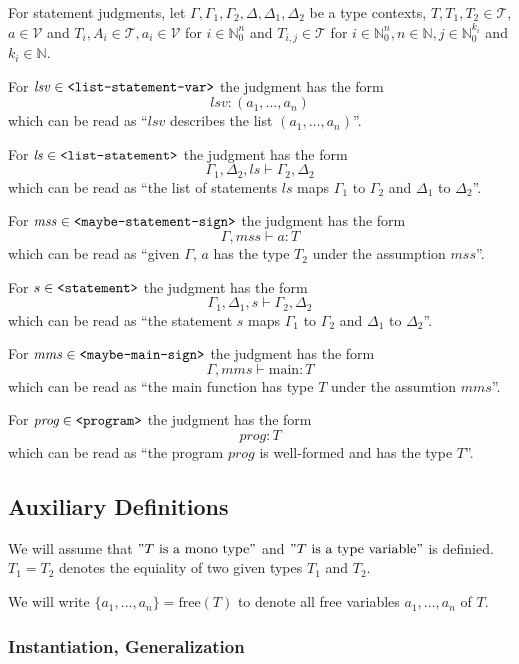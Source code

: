 \documentclass[]{scrbook}
\newcommand{\mf}[1]{\text{\texttt{#1}}}
\theoremstyle{definition}
\theoremstyle{definition}
\theoremstyle{definition}
\theoremstyle{remark}
\begin{document}
For statement judgments, let
\(\Gamma,\Gamma_1,\Gamma_2,\Delta,\Delta_1,\Delta_2\) be a type
contexts, \(T,T_1,T_2\in\mathcal{T}\), \(a\in\mathcal{V}\) and
\(T_i,A_i\in\mathcal{T},a_i\in\mathcal{V}\) for \(i\in\mathbb{N}_0^n\)
and \(T_{i,j}\in\mathcal{T}\) for
\(i\in\mathbb{N}_0^n,n\in\mathbb{N},j\in\mathbb{N}_0^{k_i}\) and
\(k_i\in\mathbb{N}\).

For \(\mathit{lsv}\in\mf{<list-statement-var>}\) the judgment has the
form \[\mathit{lsv}:(a_1,\dots,a_n)\] which can be read as
\enquote{\(\mathit{lsv}\) describes the list \((a_1,\dots,a_n)\)}.

For \(\mathit{ls}\in\mf{<list-statement>}\) the judgment has the form
\[\Gamma_1,\Delta_2,\mathit{ls}\vdash \Gamma_2,\Delta_2\] which can be
read as \enquote{the list of statements \(\mathit{ls}\) maps
\(\Gamma_1\) to \(\Gamma_2\) and \(\Delta_1\) to \(\Delta_2\)}.

For \(\mathit{mss}\in\mf{<maybe-statement-sign>}\) the judgment has the
form \[\Gamma,\mathit{mss}\vdash a:T\] which can be read as
\enquote{given \(\Gamma\), \(a\) has the type \(T_2\) under the
assumption \(\mathit{mss}\)}.

For \(s\in\mf{<statement>}\) the judgment has the form
\[\Gamma_1,\Delta_1,s\vdash \Gamma_2,\Delta_2\] which can be read as
\enquote{the statement \(s\) maps \(\Gamma_1\) to \(\Gamma_2\) and
\(\Delta_1\) to \(\Delta_2\)}.

For \(\mathit{mms}\in\mf{<maybe-main-sign>}\) the judgment has the form
\[\Gamma,\mathit{mms}\vdash \text{main}:T\] which can be read as
\enquote{the main function has type \(T\) under the assumtion
\(\mathit{mms}\)}.

For \(\textit{prog}\in\mf{<program>}\) the judgment has the form
\[\textit{prog}:T\] which can be read as \enquote{the program \(prog\)
is well-formed and has the type \(T\)}.

\subsection{Auxiliary Definitions}\label{auxiliary-definitions}

We will assume that \("T \text{ is a mono type}"\) and
\("T \text{ is a type variable}"\) is definied. \(T_1 = T_2\) denotes
the equiality of two given types \(T_1\) and \(T_2\).

We will write \(\{a_1,\dots,a_n\}=\text{free}(T)\) to denote all free
variables \(a_1,\dots,a_n\) of \(T\).

\subsubsection*{Instantiation,
Generalization}\label{instantiation-generalization}
\end{document}
